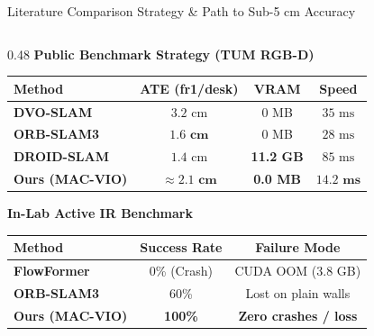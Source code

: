 \documentclass[aspectratio=169, 10pt]{beamer}
\begin{document}
\begin{frame}{Literature Comparison Strategy \& Path to Sub-5 cm Accuracy}
  \begin{columns}[T]
    \begin{column}{0.48\textwidth}
      {\normalsize \textbf{\textcolor{NavyBlue}{Public Benchmark Strategy (TUM RGB-D)}}}
      \vspace{0.1cm}
      
      \renewcommand{\arraystretch}{1.1}
      \scriptsize
      \begin{tabular}{l c c c}
        \toprule
        \textbf{Method} & \textbf{ATE (fr1/desk)} & \textbf{VRAM} & \textbf{Speed} \\
        \midrule
        \textbf{DVO-SLAM} & $3.2\text{ cm}$ & 0 MB & $35\text{ ms}$ \\
        \textbf{ORB-SLAM3} & $\mathbf{1.6\text{ cm}}$ & 0 MB & $28\text{ ms}$ \\
        \textbf{DROID-SLAM} & $1.4\text{ cm}$ & \textbf{11.2 GB} & $85\text{ ms}$ \\
        \textbf{Ours (MAC-VIO)} & $\mathbf{\approx 2.1\text{ cm}}$ & \textbf{0.0 MB} & $\mathbf{14.2\text{ ms}}$ \\
        \bottomrule
      \end{tabular}
      \vspace{0.25cm}

      {\normalsize \textbf{\textcolor{NavyBlue}{In-Lab Active IR Benchmark}}}
      \vspace{0.1cm}
      
      \renewcommand{\arraystretch}{1.1}
      \scriptsize
      \begin{tabular}{l c c}
        \toprule
        \textbf{Method} & \textbf{Success Rate} & \textbf{Failure Mode} \\
        \midrule
        \textbf{FlowFormer} & 0\% (Crash) & CUDA OOM (3.8 GB) \\
        \textbf{ORB-SLAM3} & 60\% & Lost on plain walls \\
        \textbf{Ours (MAC-VIO)} & \textbf{100\%} & \textbf{Zero crashes / loss} \\
        \bottomrule
      \end{tabular}
    \end{column}


\end{columns}
\end{frame}
\end{document}

